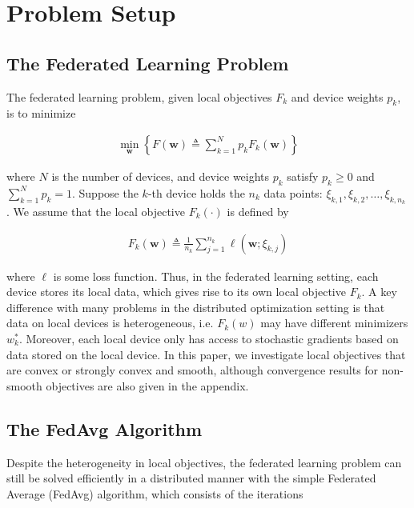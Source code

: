

\section{Problem Setup}

\subsection{The Federated Learning Problem}

The federated learning problem, given local objectives $F_k$ and device weights $p_k$, is to minimize

\begin{align}
	\min _{\mathbf{w}}\left\{F(\mathbf{w}) \triangleq \sum_{k=1}^{N} p_{k} F_{k}(\mathbf{w})\right\}
	\label{eq:problem}
\end{align}

where $N$ is the number of devices, and device weights $p_k$ satisfy $p_k \geq 0$ and $\sum_{k=1}^N p_k = 1$. Suppose the $k$-th device
holds the $n_k$ data points: $\xi_{k,1}, \xi_{k,2}, \dots, \xi_{k,n_k}$ . We assume that the local objective $F_k(\cdot)$ is defined by

\begin{align}
F_{k}(\mathbf{w}) \triangleq \frac{1}{n_{k}} \sum_{j=1}^{n_{k}} \ell\left(\mathbf{w} ; \xi_{k, j}\right)	
\label{eq:localloss}
\end{align}

where $\ell$ is some loss function. Thus, in the federated learning setting, each device stores its local data, which gives rise to its own local objective $F_k$. A key difference with many problems in the distributed optimization setting is that data on local devices is heterogeneous, i.e. $F_k(w)$ may have different minimizers $w^{\ast}_k$. Moreover, each local device only has access to stochastic gradients based on data stored on the local device. In this paper, we investigate local objectives that are convex or strongly convex and smooth, although convergence results for non-smooth objectives are also given in the appendix. 


\subsection{The FedAvg Algorithm}

Despite the heterogeneity in local objectives, the federated learning
problem can still be solved efficiently in a distributed manner with
the simple Federated Average (FedAvg) algorithm, which consists of
the iterations 

